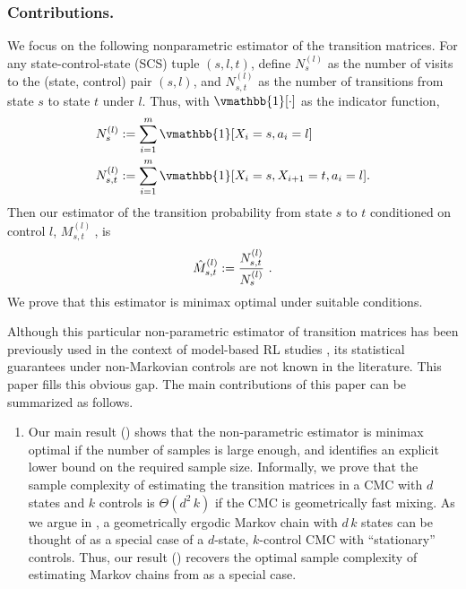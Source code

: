 \documentclass[opre,sglanonrev]{informs4}
\numberwithin{equation}{section}
\newcommand{\pow}[1]{^{(#1)}}
\newcommand{\indicator}{\vmathbb{1}}
\begin{document}
{\subsubsection*{Contributions.}

{
We focus on the following nonparametric estimator of the transition matrices. For any state-control-state (SCS) tuple $(s,l,t)$, define $N_s\pow l$ as the number of visits to the (state, control) pair $(s,l)$, and $N_{s,t}\pow l$ as the number of transitions from state $s$ to state $t$ under $l$. Thus, with $\indicator[\cdot]$ as the indicator function, 
\begin{align}
    N_s^{(l)} & :=\sum_{i=1}^m \indicator[X_i=s,a_i=l]\nonumber\\
    N_{s,t}^{(l)} & :=\sum_{i=1}^m \indicator[X_i=s,X_{i+1}=t,a_{i}=l]. \label{eq:pair-visit-count}
\end{align}
Then our estimator of the transition probability from state $s$ to $t$ conditioned on control $l$, $M_{s,t}^{(l)}\ $, is
\begin{align}
    \Hat{M}_{s,t}^{(l)} := \frac{ N_{s,t}^{(l)} }{ N_s^{(l)}}~\label{eq:lestimate}.
\end{align}
We prove that this estimator is minimax optimal under suitable conditions. }

Although this particular non-parametric estimator of transition matrices has been previously used in the context of model-based RL studies \citep{li2022settling,mannor2005empirical}, its statistical guarantees under non-Markovian controls are not known in the literature. This paper fills this obvious gap. The main contributions of this paper can be summarized as follows.

\begin{enumerate}
\item Our main result () shows that the non-parametric estimator is minimax optimal if the number of samples is large enough, and identifies an explicit lower bound on the required sample size. Informally, we prove that the sample complexity of estimating the transition matrices in a CMC with $d$ states and $k$ controls is $\Theta(d^2\,k)$ if the CMC is geometrically fast mixing.
As we argue in , a geometrically ergodic Markov chain with $d\,k$ states can be thought of as a special case of a $d$-state, $k$-control CMC with  ``stationary'' controls. Thus, our result () recovers the optimal sample complexity of estimating Markov chains from \cite{wolfer2021statistical} as a special case.


\end{enumerate}}
\end{document}
